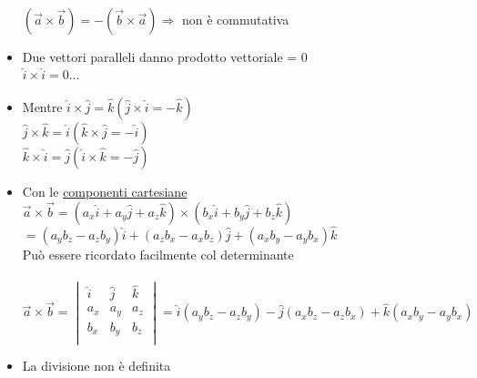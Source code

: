 \documentclass{report}
\begin{document}
\begin{itemize}
\begin{figure}[!ht]
        \end{figure}
        \\$(\vec{a}\times\vec{b})=-(\vec{b}\times\vec{a}) \Rightarrow $ non è commutativa
  \item Due vettori paralleli danno prodotto vettoriale = 0\\$\hat{i}\times\hat{i}=0 ...$
  \item Mentre $\hat{i}\times\hat{j}=\hat{k} (\hat{j}\times\hat{i}=-\hat{k})$\\$\hat{j}\times\hat{k}=\hat{i} (\hat{k}\times\hat{j}=-\hat{i})$\\$\hat{k}\times\hat{i}=\hat{j} (\hat{i}\times\hat{k}=-\hat{j})$
  \item Con le \underline{componenti cartesiane}\\
        $\vec{a}\times\vec{b}=(a_x\hat{i}+a_y\hat{j}+a_z\hat{k})\times(b_x\hat{i}+b_y\hat{j}+b_z\hat{k})$\\$=(a_yb_z-a_zb_y)\hat{i}+(a_zb_x-a_xb_z)\hat{j}+(a_xb_y-a_yb_x)\hat{k}$\\
          Può essere ricordato facilmente col determinante\\\\
        $\vec{a}\times\vec{b}=\begin{vmatrix}
          \hat{i} & \hat{j} & \hat{k} \\
          a_x     & a_y     & a_z     \\
          b_x     & b_y     & b_z     \\
        \end{vmatrix}=\hat{i}(a_yb_z-a_zb_y)-\hat{j}(a_xb_z-a_zb_x)+\hat{k}(a_xb_y-a_yb_x)$
  \item La divisione non è definita
\end{itemize}
\end{document}
